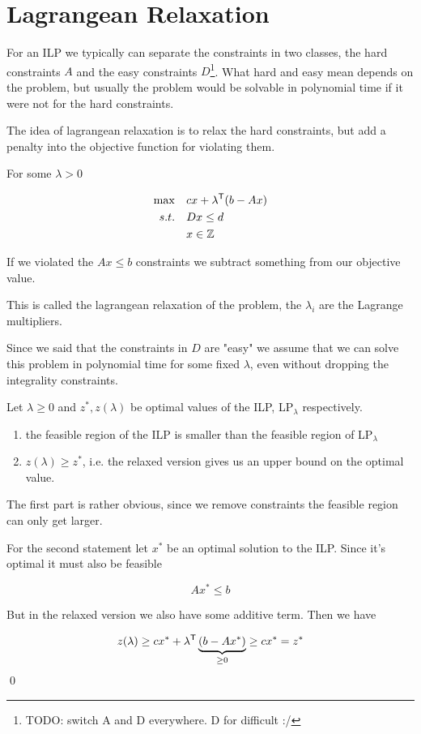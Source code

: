 \section{Lagrangean Relaxation}

For an ILP we typically can separate the constraints in two classes, the hard constraints $A$ and the easy constraints $D$\footnote{TODO: switch A and D everywhere. D for difficult :/}. What hard and easy mean depends on the problem, but usually the problem would be solvable in polynomial time if it were not for the hard constraints.

The idea of lagrangean relaxation is to relax the hard constraints, but add a penalty into the objective function for violating them.

For some $\lambda>0$

\begin{align*}
\max \quad & c x + {\lambda}^\text{\upshape \sffamily T}(b-Ax)\\
s.t. \quad & Dx \leq d\\
	& x\in \mathbb{Z}
\end{align*}

If we violated the $Ax\leq b$ constraints we subtract something from our objective value.

This is called the lagrangean relaxation of the problem, the $\lambda_i$ are the Lagrange multipliers.

Since we said that the constraints in $D$ are "easy" we assume that we can solve this problem in polynomial time for some fixed $\lambda$, even without dropping the integrality constraints.

\begin{thm} Let $\lambda \geq 0$ and $z^*,z(\lambda)$ be optimal values of the ILP, LP$_\lambda$ respectively.

\begin{enumerate}
\item the feasible region of the ILP is smaller than the feasible region of LP$_\lambda$
\item $z(\lambda)\geq z^*$, i.e. the relaxed version gives us an upper bound on the optimal value.
\end{enumerate}
\end{thm}

\begin{pr} The first part is rather obvious, since we remove constraints the feasible region can only get larger.

For the second statement let $x^*$ be an optimal solution to the ILP. Since it's optimal it must also be feasible

\[Ax^*\leq b\]

But in the relaxed version we also have some additive term. Then we have

\[z(\lambda) \geq cx^* + {\lambda}^\text{\upshape \sffamily T}\underbrace{(b-Ax^*)}_{\geq 0} \geq cx^*=z^*\]
\qed \end{pr}

